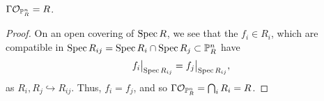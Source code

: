 \begin{theorem} \label{thm:global_sections_of_projective_n-space}
    $\Gamma \mathcal O_{\mathbb P_R^n} = R$.
\end{theorem}
\begin{proof}
    On an open covering of $\operatorname{Spec} R$, we see that the $f_i \in R_i$, which are compatible in $\operatorname{Spec} R_{ij} = \operatorname{Spec} R_i \cap \operatorname{Spec} R_j \subset \mathbb P_R^n$ have
    \[ \restr{f_i}{\Spec R_{ij}} = \restr{f_j}{\Spec R_{ij}}, \]
    as $R_i, R_j \hookrightarrow R_{ij}$. Thus, $f_i = f_j$, and so $\Gamma \mathcal O_{\mathbb P_R^n} = \bigcap_i R_i =  R$.
\end{proof}